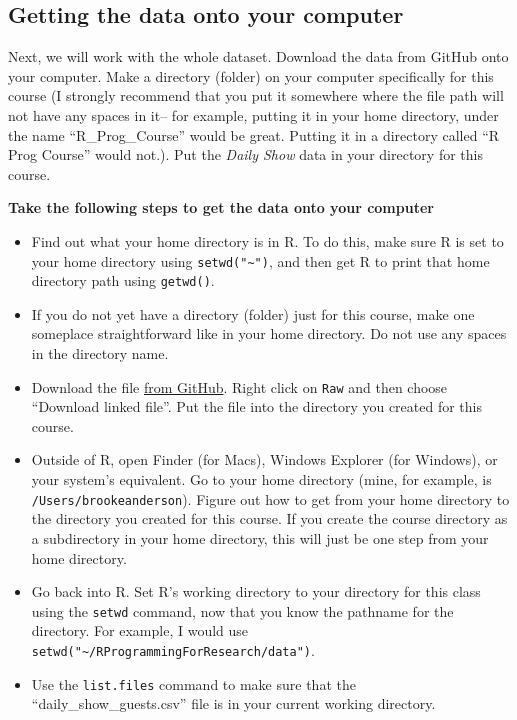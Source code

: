 \documentclass[]{book}
\providecommand{\tightlist}{%
  \setlength{\itemsep}{0pt}\setlength{\parskip}{0pt}}
\theoremstyle{definition}
\theoremstyle{definition}
\theoremstyle{definition}
\theoremstyle{remark}
\begin{document}
\subsection{Getting the data onto your
computer}\label{getting-the-data-onto-your-computer}

Next, we will work with the whole dataset. Download the data from GitHub
onto your computer. Make a directory (folder) on your computer
specifically for this course (I strongly recommend that you put it
somewhere where the file path will not have any spaces in it-- for
example, putting it in your home directory, under the name
``R\_Prog\_Course'' would be great. Putting it in a directory called ``R
Prog Course'' would not.). Put the \emph{Daily Show} data in your
directory for this course.

\textbf{Take the following steps to get the data onto your computer}

\begin{itemize}
\tightlist
\item
  Find out what your home directory is in R. To do this, make sure R is
  set to your home directory using \texttt{setwd("\textasciitilde{}")},
  and then get R to print that home directory path using
  \texttt{getwd()}.
\item
  If you do not yet have a directory (folder) just for this course, make
  one someplace straightforward like in your home directory. Do not use
  any spaces in the directory name.
\item
  Download the file
  \href{https://github.com/geanders/RProgrammingForResearch/blob/master/data/daily_show_guests.csv}{from
  GitHub}. Right click on \texttt{Raw} and then choose ``Download linked
  file''. Put the file into the directory you created for this course.
\item
  Outside of R, open Finder (for Macs), Windows Explorer (for Windows),
  or your system's equivalent. Go to your home directory (mine, for
  example, is \texttt{/Users/brookeanderson}). Figure out how to get
  from your home directory to the directory you created for this course.
  If you create the course directory as a subdirectory in your home
  directory, this will just be one step from your home directory.
\item
  Go back into R. Set R's working directory to your directory for this
  class using the \texttt{setwd} command, now that you know the pathname
  for the directory. For example, I would use
  \texttt{setwd("\textasciitilde{}/RProgrammingForResearch/data")}.
\item
  Use the \texttt{list.files} command to make sure that the
  ``daily\_show\_guests.csv'' file is in your current working directory.
\end{itemize}
\end{document}

